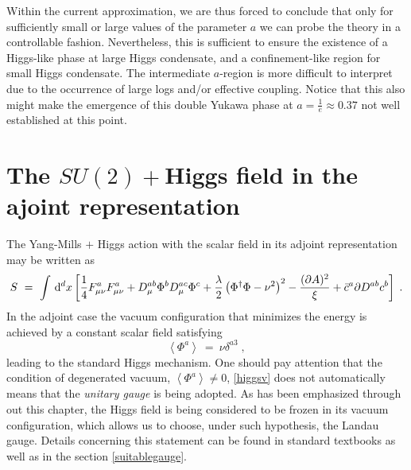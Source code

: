 Within the current approximation, we are thus forced to conclude that only for sufficiently small or large values of the parameter $a$ we can probe the theory in a controllable fashion. Nevertheless, this is sufficient to ensure the existence of a Higgs-like phase at large Higgs condensate, and a confinement-like region for small Higgs condensate. The intermediate $a$-region is more difficult to interpret due to the occurrence  of large logs and/or effective coupling. Notice that this also might make the emergence of this double Yukawa phase at $a=\frac{1}{e}\approx 0.37$ not well established at this point.























\section{The $SU(2) +$Higgs field in the ajoint representation}
\label{Adjrep}

The Yang-Mills $+$ Higgs action with the scalar field in its adjoint representation may be
written as
\begin{eqnarray}
S ~=~ \int \,\mathrm{d}^{d}x \left[ \frac14 F^{a}_{\mu\nu}F^{a}_{\mu\nu} +
D^{ab}_{\mu}\Phi^{b}D^{ac}_{\mu}\Phi^{c} + \frac{\lambda}{2}\left( \Phi^{\dagger}\Phi - \nu^{2}
\right)^{2} - \frac{(\partial A)^{2}}{\xi} + \bar{c}^{a}\partial D^{ab}c^{b}
 \right]\;.
\end{eqnarray}
In the adjoint case the vacuum configuration that minimizes the energy is achieved by a
constant scalar field satisfying
\begin{equation}
\left\langle \Phi ^{a}\right\rangle ~=~ \nu \delta ^{a3}   \;,
\label{higgsv}
\end{equation}
leading to the standard Higgs mechanism. One should pay attention that the condition of 
degenerated vacuum, $\left\langle \Phi ^{a}\right\rangle \neq 0$, \eqref{higgsv} does not
automatically means that the \emph{unitary gauge} is being adopted. As has been emphasized
through out this chapter, the Higgs field is being considered to be frozen in its vacuum
configuration, which allows us to choose, under such hypothesis, the Landau gauge. Details
concerning this statement can be found in standard textbooks
\cite{Weinberg:1996kr,Peskin:1995ev,Ryder:1985wq} as well as in the section
\ref{suitablegauge}.


